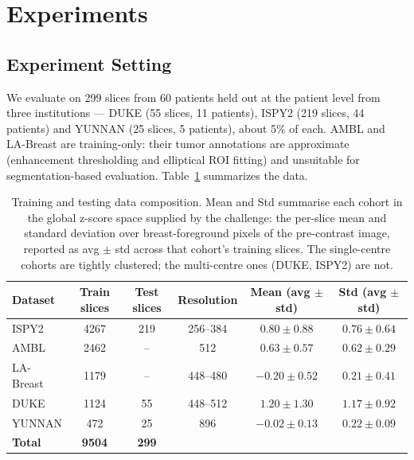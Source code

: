\documentclass[runningheads,a4paper]{llncs}
\begin{document}
\section{Experiments}
\subsection{Experiment Setting}
\label{subsec:experiment_setting}
We evaluate on 299 slices from 60 patients held out at the patient level from three institutions --- DUKE (55 slices, 11 patients), ISPY2 (219 slices, 44 patients) and YUNNAN (25 slices, 5 patients), about 5\% of each. AMBL and LA-Breast are training-only: their tumor annotations are approximate (enhancement thresholding and elliptical ROI fitting) and unsuitable for segmentation-based evaluation. Table~\ref{tab:dataset} summarizes the data.

\begin{table}[t] 
\centering
\small 
\caption{Training and testing data composition. Mean and Std summarise each cohort in the global z-score space supplied by the challenge: the per-slice mean and standard deviation over breast-foreground pixels of the pre-contrast image, reported as avg $\pm$ std across that cohort's training slices. The single-centre cohorts are tightly clustered; the multi-centre ones (DUKE, ISPY2) are not.} 
\label{tab:dataset} 
\begin{tabular}{lccccc} 
\toprule 
Dataset & Train slices & Test slices & Resolution & Mean (avg $\pm$ std) & Std (avg $\pm$ std) \\ 
\midrule 
ISPY2 & 4267 & 219 & 256--384 & $0.80 \pm 0.88$ & $0.76 \pm 0.64$ \\ 
AMBL & 2462 & -- & 512 & $0.63 \pm 0.57$ & $0.62 \pm 0.29$ \\ 
LA-Breast & 1179 & -- & 448--480 & $-0.20 \pm 0.52$ & $0.21 \pm 0.41$ \\ 
DUKE & 1124 & 55 & 448--512 & $1.20 \pm 1.30$ & $1.17 \pm 0.92$ \\ 
YUNNAN & 472 & 25 & 896 & $-0.02 \pm 0.13$ & $0.22 \pm 0.09$ \\ 
\midrule 
\textbf{Total} & \textbf{9504} & \textbf{299} & & & \\ 
\bottomrule 
\end{tabular} 
\end{table}
\end{document}
